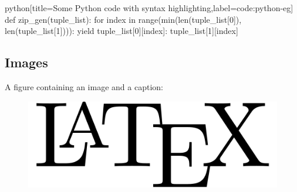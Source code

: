 \begin{code}[firstnumber=11]{python}[title={Some Python code with syntax highlighting},label=code:python-eg]
def zip_gen(tuple_list):
    for index in range(min(len(tuple_list[0]), len(tuple_list[1]))):
        yield {tuple_list[0][index]: tuple_list[1][index]}
\end{code}

\subsection{Images}

A figure containing an image and a caption:
\begin{figure}[H]
    \includegraphics[width=0.8\linewidth]{LaTeX-logo.png}
\end{figure}
